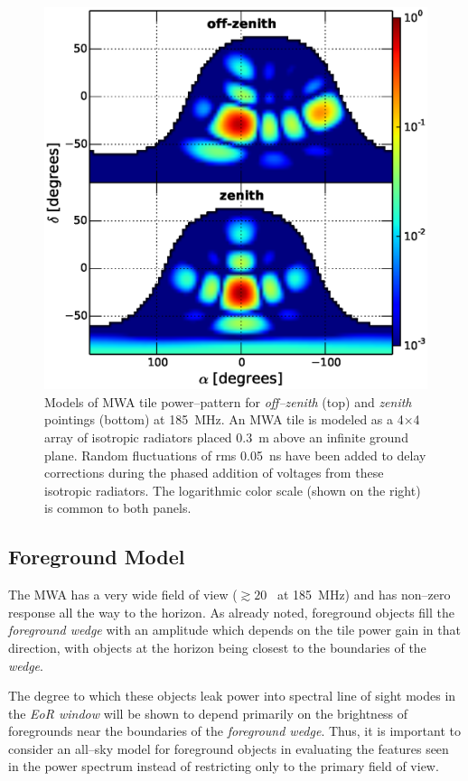 \documentclass[preprint2,iop,numberedappendix]{emulateapj}
\begin{document}
\begin{figure}[htb]
\centering
\includegraphics[width=\linewidth]{figures/v1_0/delta_array_powerpattern_0.3m_ground_custom.eps}
\caption{Models of MWA tile power--pattern for {\it off--zenith} (top) and {\it zenith} pointings (bottom) at 185~MHz. An MWA tile is modeled as a 4$\times$4 array of isotropic radiators placed 0.3~m above an infinite ground plane. Random fluctuations of rms 0.05~ns have been added to delay corrections during the phased addition of voltages from these isotropic radiators. The logarithmic color scale (shown on the right) is common to both panels. \label{fig:power_pattern}}
\end{figure}

\subsection{Foreground Model}\label{sec:foreground}

The MWA has a very wide field of view ($\gtrsim 20$\arcdeg~ at 185~MHz) and has non--zero response all the way to the horizon. As already noted, foreground objects fill the {\it foreground wedge} with an amplitude which depends on the tile power gain in that direction, with objects at the horizon being closest to the boundaries of the {\it wedge}. 

The degree to which these objects leak power into spectral line of sight modes in the {\it EoR window} will be shown to depend primarily on the brightness of foregrounds near the boundaries of the {\it foreground wedge}. Thus, it is important to consider an all--sky model for foreground objects in evaluating the features seen in the power spectrum instead of restricting only to the primary field of view. 
\end{document}
